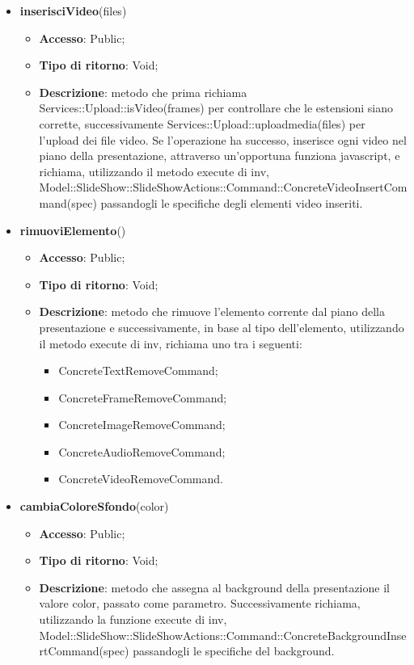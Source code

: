 {{\begin{itemize}
\begin{itemize}
		\end{itemize}
		\item \textbf{inserisciVideo}(files)
		\begin{itemize}
			\item \textbf{Accesso}: Public;
			\item \textbf{Tipo di ritorno}: Void;
			\item \textbf{Descrizione}: metodo che prima richiama Services::\-Upload::\-isVideo(frames) per controllare che le estensioni siano corrette, successivamente Services::\-Upload::\-uploadmedia(files) per l'upload dei file video. Se l'operazione ha successo,  inserisce ogni video nel piano della presentazione, attraverso un'opportuna funziona javascript, e richiama, utilizzando il metodo execute di inv, Model::\-SlideShow::\-SlideShowActions::\-Command::\-ConcreteVideoInsertCommand(spec) passandogli le specifiche degli elementi video inseriti.
		\end{itemize}
		\item \textbf{rimuoviElemento}()
		\begin{itemize}
			\item \textbf{Accesso}: Public;
			\item \textbf{Tipo di ritorno}: Void;
			\item \textbf{Descrizione}: metodo che rimuove l'elemento corrente dal piano della presentazione e successivamente, in base al tipo dell'elemento, utilizzando il metodo execute di inv, richiama uno tra i seguenti:
			\begin{itemize}
				\item ConcreteTextRemoveCommand;
				\item ConcreteFrameRemoveCommand;
				\item ConcreteImageRemoveCommand;
				\item ConcreteAudioRemoveCommand;
				\item ConcreteVideoRemoveCommand.
			\end{itemize}
		\end{itemize}
		\item \textbf{cambiaColoreSfondo}(color)
		\begin{itemize}
			\item \textbf{Accesso}: Public;
			\item \textbf{Tipo di ritorno}: Void;
			\item \textbf{Descrizione}: metodo che assegna al background della presentazione il valore color, passato come parametro. Successivamente richiama, utilizzando la funzione execute di inv, Model::\-SlideShow::\-SlideShowActions::\-Command::\-ConcreteBackgroundInsertCommand(spec) passandogli le specifiche del background.

\end{itemize}
\end{itemize}}}
